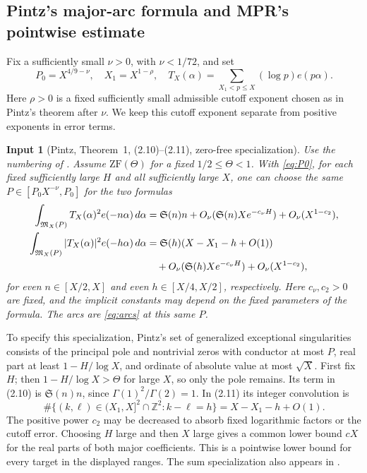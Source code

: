 \documentclass[11pt]{article}
\newtheorem{inputthm}[theorem]{Input}
\theoremstyle{definition}
\theoremstyle{remark}
\numberwithin{equation}{section}
\newcommand{\Z}{\mathbb Z}
\newcommand{\M}{\mathfrak M}
\begin{document}
\subsection{Pintz's major-arc formula and MPR's pointwise estimate}

Fix a sufficiently small $\nu>0$, with $\nu<1/72$, and set
\begin{equation}\label{eq:P0}
 P_0=X^{4/9-\nu},\quad X_1=X^{1-\rho},\quad
 T_X(\alpha)=\sum_{X_1<p\le X}(\log p)e(p\alpha).
\end{equation}
Here $\rho>0$ is a fixed sufficiently small admissible cutoff exponent
chosen as in Pintz's theorem after $\nu$. We keep this cutoff exponent
separate from positive exponents in error terms.

\begin{inputthm}[Pintz, Theorem~1, (2.10)--(2.11), zero-free specialization]
\label{input:Pintz}
Use the numbering of \cite[arXiv v1]{PintzMajor}. Assume
$\mathrm{ZF}(\Theta)$ for a fixed $1/2\le\Theta<1$.
With \eqref{eq:P0}, for each fixed sufficiently large $H$ and all
sufficiently large $X$, one can choose the same
$P\in[P_0X^{-\nu},P_0]$ for the two formulas
\begin{align}
 \int_{\M_X(P)}T_X(\alpha)^2e(-n\alpha)\,d\alpha
 &=\mathfrak S(n)n+
 O_\nu(\mathfrak S(n)Xe^{-c_\nu H})+O_\nu(X^{1-c_2}),
                       \label{eq:Pintzplus}\\
 \int_{\M_X(P)}|T_X(\alpha)|^2e(-h\alpha)\,d\alpha
 &=\mathfrak S(h)(X-X_1-h+O(1))\notag\\
 &\quad+O_\nu(\mathfrak S(h)Xe^{-c_\nu H})+O_\nu(X^{1-c_2}),
                       \label{eq:Pintzminus}
\end{align}
for even $n\in[X/2,X]$ and even $h\in[X/4,X/2]$, respectively.
Here $c_\nu,c_2>0$ are fixed, and the implicit constants may depend
on the fixed parameters of the formula. The arcs are \eqref{eq:arcs}
at this same $P$.
\end{inputthm}

To specify this specialization, Pintz's set of generalized exceptional
singularities consists of the principal pole and nontrivial zeros with
conductor at most $P$, real part at least $1-H/\log X$, and ordinate
of absolute value at most $\sqrt X$. First fix $H$; then
$1-H/\log X>\Theta$ for large $X$, so only the pole remains.
Its term in (2.10) is $\mathfrak S(n)n$, since
$\Gamma(1)^2/\Gamma(2)=1$. In (2.11) its integer convolution is
\[
 \#\{(k,\ell)\in(X_1,X]^2\cap\Z^2:k-\ell=h\}
                  =X-X_1-h+O(1).
\]
The positive power $c_2$ may be decreased to absorb fixed logarithmic
factors or the cutoff error. Choosing $H$ large and then $X$ large
gives a common lower bound $cX$ for the real parts of both major
coefficients. This is a pointwise lower bound for every target in the
displayed ranges. The sum specialization also appears in
\cite[\S2.1]{PA}.
\end{document}
